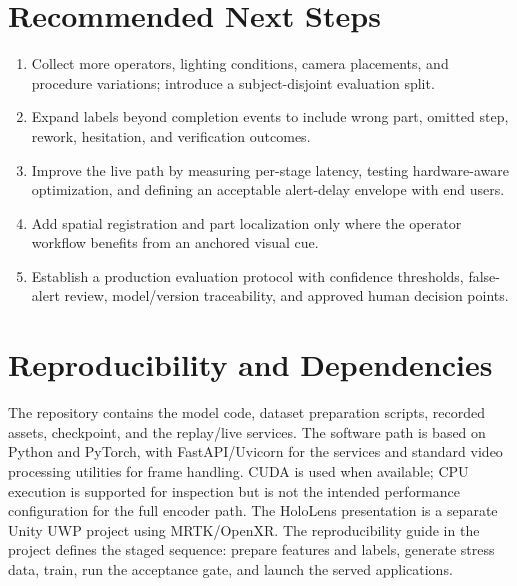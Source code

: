 \section{Recommended Next Steps}

\begin{enumerate}
    \item Collect more operators, lighting conditions, camera placements, and
    procedure variations; introduce a subject-disjoint evaluation split.
    \item Expand labels beyond completion events to include wrong part, omitted
    step, rework, hesitation, and verification outcomes.
    \item Improve the live path by measuring per-stage latency, testing
    hardware-aware optimization, and defining an acceptable alert-delay
    envelope with end users.
    \item Add spatial registration and part localization only where the
    operator workflow benefits from an anchored visual cue.
    \item Establish a production evaluation protocol with confidence
    thresholds, false-alert review, model/version traceability, and approved
    human decision points.
\end{enumerate}

\section{Reproducibility and Dependencies}

The repository contains the model code, dataset preparation scripts, recorded
assets, checkpoint, and the replay/live services. The software path is based on
Python and PyTorch, with FastAPI/Uvicorn for the services and standard video
processing utilities for frame handling. CUDA is used when available; CPU
execution is supported for inspection but is not the intended performance
configuration for the full encoder path. The HoloLens presentation is a
separate Unity UWP project using MRTK/OpenXR. The reproducibility guide in the
project defines the staged sequence: prepare features and labels, generate
stress data, train, run the acceptance gate, and launch the served applications.
